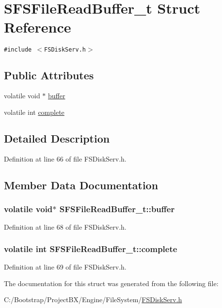 \hypertarget{struct_s_f_s_file_read_buffer__t}{
\section{SFSFileReadBuffer\_\-t Struct Reference}
\label{struct_s_f_s_file_read_buffer__t}
}
{\tt \#include $<$FSDiskServ.h$>$}

\subsection*{Public Attributes}
\begin{CompactItemize}
\item 
volatile void $\ast$ \hyperlink{struct_s_f_s_file_read_buffer__t_bc7bdce1c0dfdad630db6fedce106bab}{buffer}
\item 
volatile int \hyperlink{struct_s_f_s_file_read_buffer__t_87bd7289db7343742a40bdc52f4fff0a}{complete}
\end{CompactItemize}


\subsection{Detailed Description}


Definition at line 66 of file FSDiskServ.h.

\subsection{Member Data Documentation}
\hypertarget{struct_s_f_s_file_read_buffer__t_bc7bdce1c0dfdad630db6fedce106bab}{
\subsubsection[{buffer}]{\setlength{\rightskip}{0pt plus 5cm}volatile void$\ast$ {\bf SFSFileReadBuffer\_\-t::buffer}}}
\label{struct_s_f_s_file_read_buffer__t_bc7bdce1c0dfdad630db6fedce106bab}




Definition at line 68 of file FSDiskServ.h.\hypertarget{struct_s_f_s_file_read_buffer__t_87bd7289db7343742a40bdc52f4fff0a}{
\subsubsection[{complete}]{\setlength{\rightskip}{0pt plus 5cm}volatile int {\bf SFSFileReadBuffer\_\-t::complete}}}
\label{struct_s_f_s_file_read_buffer__t_87bd7289db7343742a40bdc52f4fff0a}




Definition at line 69 of file FSDiskServ.h.

The documentation for this struct was generated from the following file:\begin{CompactItemize}
\item 
C:/Bootstrap/ProjectBX/Engine/FileSystem/\hyperlink{_f_s_disk_serv_8h}{FSDiskServ.h}\end{CompactItemize}
